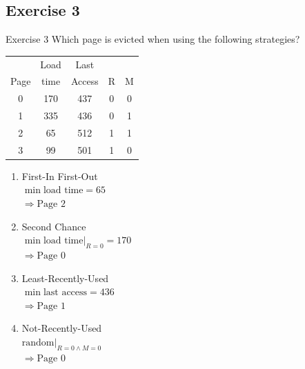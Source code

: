 \documentclass[10pt]{beamer}
\begin{document}
\subsection*{Exercise 3}
\frame{\subsectionpage}
\begin{frame}{Exercise 3}
Which page is evicted when using the following strategies?
	\begin{minipage}[t]{0.5\linewidth}
	 \vspace{1cm}
		\begin{tabular}[t]{@{}ccccc@{}}
			\toprule
			      & Load & Last & \\
			Page &  time & Access & R & M \\
			\midrule
			0 & 170 & 437 & 0 & 0 \\
			1 & 335 & 436 & 0 & 1 \\
			2 & 65 & 512 & 1 & 1 \\
			3 & 99 & 501 & 1 & 0 \\
			\bottomrule
		\end{tabular}
	\end{minipage}%
	\begin{minipage}[t]{0.45\linewidth}		
		\medskip

		\begin{enumerate}
			\item First-In First-Out \\ \alert{$\min{\text{load time}} = 65$ \\ $\Rightarrow \text{Page } 2$}
			\item Second Chance \\ \alert{$\min{\text{load time}} |_{R = 0} = 170$ \\ $\Rightarrow \text{Page } 0$}
			\item Least-Recently-Used \\ \alert{$\min{\text{last access}} = 436$ \\ $\Rightarrow \text{Page } 1$}
			\item Not-Recently-Used \\ \alert{$\text{random} |_{R = 0 \wedge M = 0}$ \\ $\Rightarrow \text{Page } 0$}
		\end{enumerate}

	\end{minipage}
\end{frame}
\end{document}
